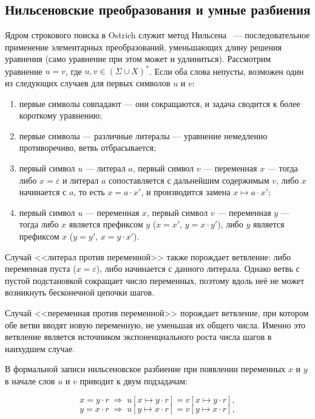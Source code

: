 \documentclass[14pt, russian]{scrartcl}
\begin{document}
\subsection{Нильсеновские преобразования и умные разбиения}
\label{sec:nielsen}

Ядром строкового поиска в Ostrich служит метод Нильсена~\cite{nielsen1917} ---
последовательное применение элементарных преобразований, уменьшающих длину решения
уравнения (само уравнение при этом может и удлиниться). Рассмотрим уравнение $u = v$,
где $u, v \in (\Sigma \cup X)^*$. Если оба слова непусты, возможен один из следующих
случаев для первых символов $u$ и $v$:

\begin{enumerate}
\item первые символы совпадают --- они сокращаются, и задача сводится к более короткому уравнению;
\item первые символы --- различные литералы --- уравнение немедленно противоречиво, ветвь отбрасывается;
\item первый символ $u$ --- литерал $a$, первый символ $v$ --- переменная $x$ --- тогда
  либо $x = \varepsilon$ и литерал $a$ сопоставляется с дальнейшим содержимым $v$,
  либо $x$ начинается с $a$, то есть $x = a \cdot x'$, и производится замена $x \mapsto a \cdot x'$;
\item первый символ $u$ --- переменная $x$, первый символ $v$ --- переменная $y$ --- тогда
  либо $x$ является префиксом $y$ ($x = x'$, $y = x \cdot y'$), либо $y$ является
  префиксом $x$ ($y = y'$, $x = y \cdot x'$).
\end{enumerate}

Случай <<литерал против переменной>> также порождает ветвление: либо переменная
пуста ($x = \varepsilon$), либо начинается с данного литерала. Однако ветвь с пустой
подстановкой сокращает число переменных, поэтому вдоль неё не может возникнуть
бесконечной цепочки шагов.

Случай <<переменная против переменной>> порождает ветвление, при котором обе ветви
вводят новую переменную, не уменьшая их общего числа. Именно это ветвление является
источником экспоненциального роста числа шагов в наихудшем случае.

В формальной записи нильсеновское разбиение при появлении переменных $x$ и $y$ в
начале слов $u$ и $v$ приводит к двум подзадачам:

\begin{equation}
x = y \cdot r \;\Rightarrow\; u[x \mapsto y \cdot r] = v[x \mapsto y \cdot r],
\end{equation}
\begin{equation}
y = x \cdot r \;\Rightarrow\; u[y \mapsto x \cdot r] = v[y \mapsto x \cdot r],
\end{equation}
\end{document}
